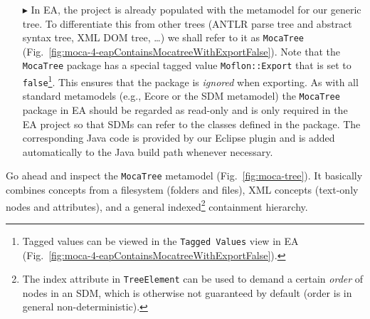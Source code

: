\begin{enumerate}
\item[$\blacktriangleright$] In EA, the project is already populated with the metamodel for our generic tree.
To differentiate this from other trees (ANTLR parse tree and abstract syntax tree, XML DOM tree, \ldots) we shall refer to it as \texttt{MocaTree}
(Fig.~\ref{fig:moca-4-eapContainsMocatreeWithExportFalse}).
Note that the \texttt{MocaTree} package has a special tagged value \texttt{Moflon::Export} that is set to \texttt{false}\footnote{Tagged values can be viewed in
the \texttt{Tagged Values} view in EA (Fig.~\ref{fig:moca-4-eapContainsMocatreeWithExportFalse}).}.
This ensures that the package is \emph{ignored} when exporting.
As with all standard metamodels (e.g., Ecore or the SDM metamodel) the \texttt{MocaTree} package in EA should be regarded as read-only and is only required in
the EA project so that SDMs can refer to the classes defined in the package.
The corresponding Java code is provided by our Eclipse plugin and is added automatically to the Java build path whenever necessary.


\end{enumerate}

Go ahead and inspect the \texttt{MocaTree} metamodel (Fig.~\ref{fig:moca-tree}).
It basically combines concepts from a filesystem (folders and files), XML concepts (text-only nodes and attributes), and a general indexed\footnote{The index
attribute in \texttt{TreeElement} can be used to demand a certain \emph{order} of nodes in an SDM, which is otherwise not guaranteed by default (order is in
general non-deterministic).} containment hierarchy.

 
